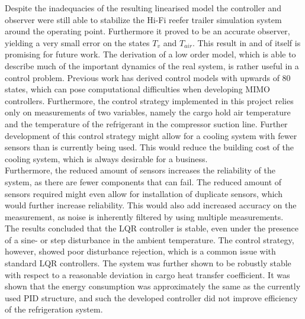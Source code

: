 Despite the inadequacies of the resulting linearised model the controller and observer were still able to stabilize the Hi-Fi reefer trailer simulation system around the operating point. Furthermore it proved to be an accurate observer, yielding a very small error on the states $T_v$ and $T_{air}$. This result in and of itself is promising for future work. The derivation of a low order model, which is able to describe much of the important dynamics of the real system, is rather useful in a control problem. Previous work has derived control models with upwards of 80 states, which can pose computational difficulties when developing MIMO controllers. Furthermore, the control strategy implemented in this project relies only on measurements of two variables, namely the cargo hold air temperature and the temperature of the refrigerant in the compressor suction line. Further development of this control strategy might allow for a cooling system with fewer sensors than is currently being used. This would reduce the building cost of the cooling system, which is always desirable for a business. \\

Furthermore, the reduced amount of sensors increases the reliability of the system, as there are fewer components that can fail. The reduced amount of sensors required might even allow for installation of duplicate sensors, which would further increase reliability. This would also add increased accuracy on the measurement, as noise is inherently filtered by using multiple measurements.\\

The results concluded that the LQR controller is stable, even under the presence of a sine- or step disturbance in the ambient temperature. The control strategy, however, showed poor disturbance rejection, which is a common issue with standard LQR controllers. The system was further shown to be robustly stable with respect to a reasonable deviation in cargo heat transfer coefficient. It was shown that the energy consumption was approximately the same as the currently used PID structure, and such the developed controller did not improve efficiency of the refrigeration system.\\


















